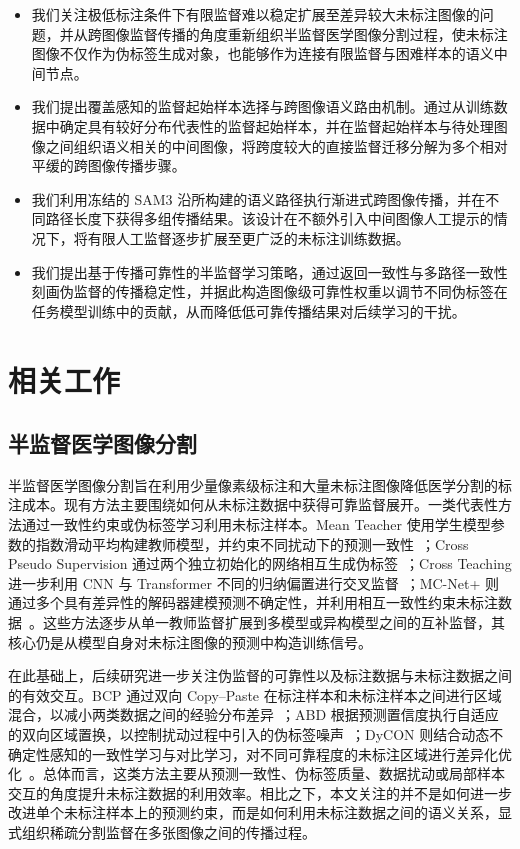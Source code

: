 \documentclass[UTF8,a4paper,10pt,twocolumn]{ctexart}
\begin{document}
\begin{itemize}
    \item 我们关注极低标注条件下有限监督难以稳定扩展至差异较大未标注图像的问题，并从跨图像监督传播的角度重新组织半监督医学图像分割过程，使未标注图像不仅作为伪标签生成对象，也能够作为连接有限监督与困难样本的语义中间节点。

    \item 我们提出覆盖感知的监督起始样本选择与跨图像语义路由机制。通过从训练数据中确定具有较好分布代表性的监督起始样本，并在监督起始样本与待处理图像之间组织语义相关的中间图像，将跨度较大的直接监督迁移分解为多个相对平缓的跨图像传播步骤。

    \item 我们利用冻结的 SAM3 沿所构建的语义路径执行渐进式跨图像传播，并在不同路径长度下获得多组传播结果。该设计在不额外引入中间图像人工提示的情况下，将有限人工监督逐步扩展至更广泛的未标注训练数据。

    \item 我们提出基于传播可靠性的半监督学习策略，通过返回一致性与多路径一致性刻画伪监督的传播稳定性，并据此构造图像级可靠性权重以调节不同伪标签在任务模型训练中的贡献，从而降低低可靠传播结果对后续学习的干扰。
\end{itemize}





\section{相关工作}

\subsection{半监督医学图像分割}

半监督医学图像分割旨在利用少量像素级标注和大量未标注图像降低医学分割的标注成本。现有方法主要围绕如何从未标注数据中获得可靠监督展开。一类代表性方法通过一致性约束或伪标签学习利用未标注样本。Mean Teacher 使用学生模型参数的指数滑动平均构建教师模型，并约束不同扰动下的预测一致性~\cite{tarvainen2017meanteacher}；Cross Pseudo Supervision 通过两个独立初始化的网络相互生成伪标签~\cite{chen2021cps}；Cross Teaching 进一步利用 CNN 与 Transformer 不同的归纳偏置进行交叉监督~\cite{luo2022crossteaching}；MC-Net+ 则通过多个具有差异性的解码器建模预测不确定性，并利用相互一致性约束未标注数据~\cite{wu2022mcnet}。这些方法逐步从单一教师监督扩展到多模型或异构模型之间的互补监督，其核心仍是从模型自身对未标注图像的预测中构造训练信号。

在此基础上，后续研究进一步关注伪监督的可靠性以及标注数据与未标注数据之间的有效交互。BCP 通过双向 Copy--Paste 在标注样本和未标注样本之间进行区域混合，以减小两类数据之间的经验分布差异~\cite{bai2023bcp}；ABD 根据预测置信度执行自适应的双向区域置换，以控制扰动过程中引入的伪标签噪声~\cite{chi2024abd}；DyCON 则结合动态不确定性感知的一致性学习与对比学习，对不同可靠程度的未标注区域进行差异化优化~\cite{assefa2025dycon}。总体而言，这类方法主要从预测一致性、伪标签质量、数据扰动或局部样本交互的角度提升未标注数据的利用效率。相比之下，本文关注的并不是如何进一步改进单个未标注样本上的预测约束，而是如何利用未标注数据之间的语义关系，显式组织稀疏分割监督在多张图像之间的传播过程。
\end{document}
